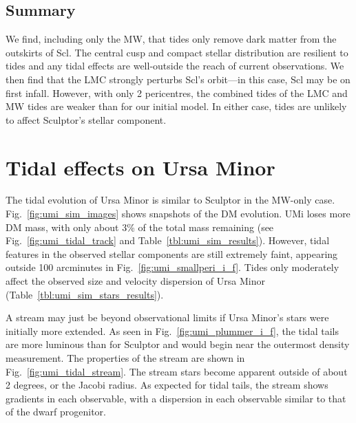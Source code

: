 \subsection{Summary}\label{summary}

We find, including only the MW, that tides only remove dark matter from
the outskirts of Scl. The central cusp and compact stellar distribution
are resilient to tides and any tidal effects are well-outside the reach
of current observations. We then find that the LMC strongly perturbs
Scl's orbit---in this case, Scl may be on first infall. However, with
only 2 pericentres, the combined tides of the LMC and MW tides are
weaker than for our initial model. In either case, tides are unlikely to
affect Sculptor's stellar component.

\section{Tidal effects on Ursa Minor}\label{tidal-effects-on-ursa-minor}

The tidal evolution of Ursa Minor is similar to Sculptor in the MW-only
case. Fig.~\ref{fig:umi_sim_images} shows snapshots of the DM evolution.
UMi loses more DM mass, with only about 3\% of the total mass remaining
(see Fig.~\ref{fig:umi_tidal_track} and
Table~\ref{tbl:umi_sim_results}). However, tidal features in the
observed stellar components are still extremely faint, appearing outside
100 arcminutes in Fig.~\ref{fig:umi_smallperi_i_f}. Tides only
moderately affect the observed size and velocity dispersion of Ursa
Minor (Table~\ref{tbl:umi_sim_stars_results}).

A stream may just be beyond observational limits if Ursa Minor's stars
were initially more extended. As seen in Fig.~\ref{fig:umi_plummer_i_f},
the tidal tails are more luminous than for Sculptor and would begin near
the outermost density measurement. The properties of the stream are
shown in Fig.~\ref{fig:umi_tidal_stream}. The stream stars become
apparent outside of about 2 degrees, or the Jacobi radius. As expected
for tidal tails, the stream shows gradients in each observable, with a
dispersion in each observable similar to that of the dwarf progenitor.


